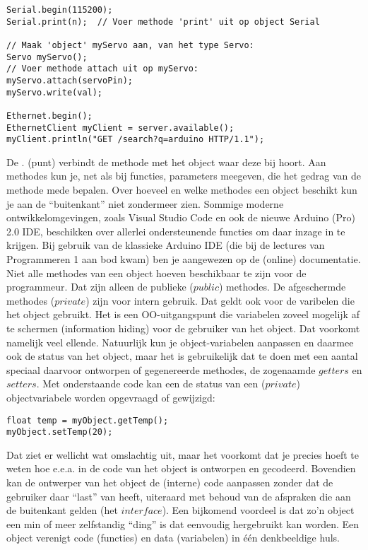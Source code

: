 \begin{lstlisting}[language=Arduino]
Serial.begin(115200);
Serial.print(n);  // Voer methode 'print' uit op object Serial

// Maak 'object' myServo aan, van het type Servo:
Servo myServo();  
// Voer methode attach uit op myServo:
myServo.attach(servoPin); 
myServo.write(val);

Ethernet.begin();
EthernetClient myClient = server.available();
myClient.println("GET /search?q=arduino HTTP/1.1");
\end{lstlisting}

De $.$ (punt) verbindt de methode met het object waar deze bij hoort. Aan methodes kun je, net als bij functies, parameters meegeven, die het gedrag van de methode mede bepalen. Over hoeveel en welke methodes een object beschikt kun je aan de “buitenkant” niet zondermeer zien. Sommige moderne ontwikkelomgevingen, zoals Visual Studio Code en ook de nieuwe Arduino (Pro) 2.0 IDE, beschikken over allerlei ondersteunende functies om daar inzage in te krijgen.\newline 
Bij gebruik van de klassieke Arduino IDE (die bij de lectures van Programmeren 1 aan bod kwam) ben je aangewezen op de (online) documentatie. Niet alle methodes van een object hoeven beschikbaar te zijn voor de programmeur. Dat zijn alleen de publieke ($public$) methodes. De afgeschermde methodes ($private$) zijn voor intern gebruik. Dat geldt ook voor de varibelen die het object gebruikt. Het is een OO-uitgangspunt die variabelen zoveel mogelijk af te schermen (information hiding) voor de gebruiker van het object. Dat voorkomt namelijk veel ellende. Natuurlijk kun je object-variabelen aanpassen en daarmee ook de status van het object, maar het is gebruikelijk dat te doen met een aantal speciaal daarvoor ontworpen of gegenereerde methodes, de zogenaamde $getters$ en $setters$. Met onderstaande code kan een de status van een ($private$) objectvariabele worden opgevraagd of gewijzigd:

\begin{lstlisting}[language=Arduino]
float temp = myObject.getTemp();
myObject.setTemp(20);
\end{lstlisting}

Dat ziet er wellicht wat omslachtig uit, maar het voorkomt dat je precies hoeft te weten hoe e.e.a. in de code van het object is ontworpen en gecodeerd. Bovendien kan de ontwerper van het object de (interne) code aanpassen zonder dat de gebruiker daar “last” van heeft, uiteraard met behoud van de afspraken die aan de buitenkant gelden (het $interface$). Een bijkomend voordeel is dat zo’n object een min of meer zelfstandig “ding” is dat eenvoudig hergebruikt kan worden. Een object verenigt code (functies) en data (variabelen) in één denkbeeldige huls. \newline \newline

